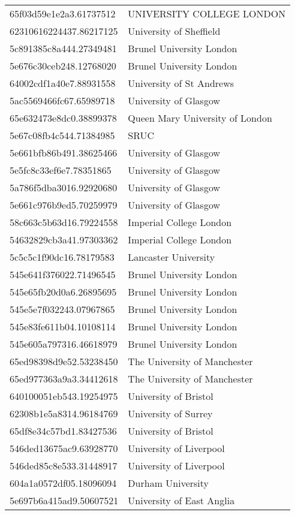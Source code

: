 \begin{tabular}{ll}
65f03d59e1e2a3.61737512 & UNIVERSITY COLLEGE LONDON \\
62310616224437.86217125 & University of Sheffield \\
5c891385c8a444.27349481 & Brunel University London \\
5e676c30ceb248.12768020 & Brunel University London \\
64002cdf1a40e7.88931558 & University of St Andrews \\
5ac5569466fc67.65989718 & University of Glasgow \\
65e632473e8dc0.38899378 & Queen Mary University of London \\
5e67c08fb4c544.71384985 & SRUC \\
5e661bfb86b491.38625466 & University of Glasgow \\
5e5fc8c33ef6e7.78351865 & University of Glasgow \\
5a786f5dba3016.92920680 & University of Glasgow \\
5e661c976b9ed5.70259979 & University of Glasgow \\
58c663c5b63d16.79224558 & Imperial College London \\
54632829cb3a41.97303362 & Imperial College London \\
5c5c5c1f90dc16.78179583 & Lancaster University \\
545e641f376022.71496545 & Brunel University London \\
545e65fb20d0a6.26895695 & Brunel University London \\
545e5e7f032243.07967865 & Brunel University London \\
545e83fe611b04.10108114 & Brunel University London \\
545e605a797316.46618979 & Brunel University London \\
65ed98398d9e52.53238450 & The University of Manchester \\
65ed977363a9a3.34412618 & The University of Manchester \\
640100051eb543.19254975 & University of Bristol \\
62308b1e5a8314.96184769 & University of Surrey \\
65df8e34c57bd1.83427536 & University of Bristol \\
546ded13675ac9.63928770 & University of Liverpool \\
546ded85c8e533.31448917 & University of Liverpool \\
604a1a0572df05.18096094 & Durham University \\
5e697b6a415ad9.50607521 & University of East Anglia \\

\end{tabular}
